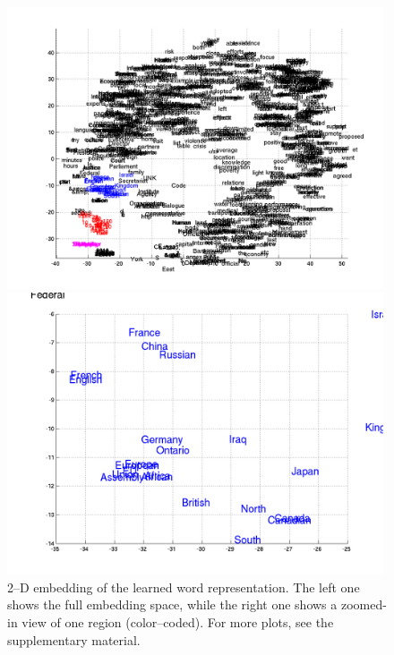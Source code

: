 \begin{figure}[ht]
    \centering
    \begin{minipage}{0.48\textwidth}
        \centering
        \includegraphics[width=0.99\textwidth]{figures/word_all.png}
    \end{minipage}
    \hfill
    \begin{minipage}{0.48\textwidth}
        \centering
        \includegraphics[width=0.99\textwidth]{figures/word_countries.png}
    \end{minipage}
    \caption{2--D embedding of the learned word representation. The left
    one shows the full embedding space, while the right one shows a
    zoomed-in view of one region (color--coded). For more plots, see the
supplementary material.} 
    \label{fig:word_embed}
    \vspace{-3mm}
\end{figure}


